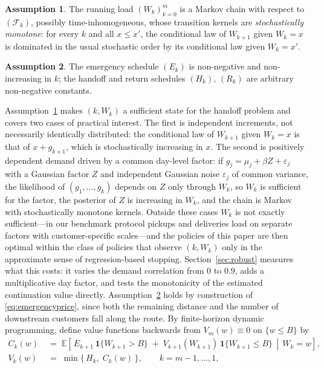 \documentclass[preprint,authoryear,12pt]{elsarticle}
\theoremstyle{definition}
\newtheorem{assumption}{Assumption}
\theoremstyle{remark}
\begin{document}
\begin{assumption}\label{ass:markov}
The running load $(W_k)_{k=0}^m$ is a Markov chain with respect to
$(\mathcal F_k)$, possibly time-inhomogeneous, whose transition kernels
are \emph{stochastically monotone}: for every $k$ and all $x \le x'$,
the conditional law of $W_{k+1}$ given $W_k = x$ is dominated in the
usual stochastic order by its conditional law given $W_k = x'$.
\end{assumption}

\begin{assumption}\label{ass:prices}
The emergency schedule $(E_k)$ is non-negative and non-increasing in $k$;
the handoff and return schedules $(H_k)$, $(R_k)$ are arbitrary
non-negative constants.
\end{assumption}

Assumption~\ref{ass:markov} makes $(k, W_k)$ a sufficient state for
the handoff problem and covers two cases of practical interest. The first is independent
increments, not necessarily identically distributed: the conditional
law of $W_{k+1}$ given $W_k = x$ is that of $x + g_{k+1}$, which is
stochastically increasing in $x$. The second is positively dependent
demand driven by a common day-level factor: if
$g_j = \mu_j + \beta Z + \varepsilon_j$ with a Gaussian factor $Z$ and
independent Gaussian noise $\varepsilon_j$ of common variance, the
likelihood of $(g_1,\dots,g_k)$ depends on $Z$ only through $W_k$, so
$W_k$ is sufficient for the factor, the posterior of $Z$ is increasing in
$W_k$, and the chain is Markov with stochastically monotone kernels.
Outside these cases $W_k$ is not exactly sufficient---in our benchmark
protocol pickups and deliveries load on separate factors with
customer-specific scales---and the policies of this paper are then
optimal within the class of policies that observe $(k, W_k)$ only in the
approximate sense of regression-based stopping. Section~\ref{sec:robust}
measures what this costs: it varies the demand correlation from $0$ to
$0.9$, adds a multiplicative day factor, and tests the monotonicity of
the estimated continuation value directly.
Assumption~\ref{ass:prices} holds by construction of
\eqref{eq:emergencyprice}, since both the remaining distance and the
number of downstream customers fall along the route. By finite-horizon
dynamic programming, define value functions backwards from
$V_m(w) \equiv 0$ on $\{w \le B\}$ by
\begin{align}
  C_k(w) &\;=\;
  \mathbb E\!\left[\,
    E_{k+1}\,\mathbf 1\{W_{k+1} > B\}
    \;+\; V_{k+1}(W_{k+1})\,\mathbf 1\{W_{k+1} \le B\}
    \,\middle|\, W_k = w \right],
  \label{eq:contvalue}\\[3pt]
  V_k(w) &\;=\; \min\{\, H_k ,\; C_k(w) \,\}, \qquad k = m-1,\dots,1 ,
  \label{eq:bellman}
\end{align}
\end{document}
